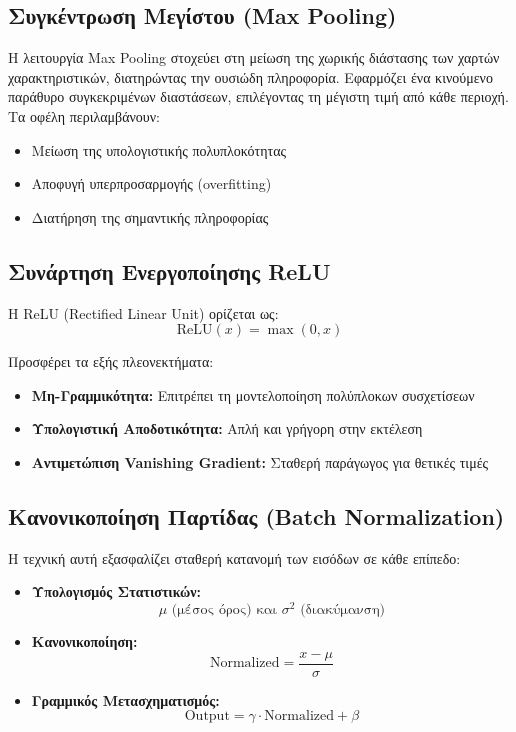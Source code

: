 \documentclass[a4paper,12pt]{article}
\begin{document}
\subsection*{Συγκέντρωση Μεγίστου (Max Pooling)}
Η λειτουργία Max Pooling στοχεύει στη μείωση της χωρικής διάστασης των χαρτών χαρακτηριστικών, διατηρώντας την ουσιώδη πληροφορία. Εφαρμόζει ένα κινούμενο παράθυρο συγκεκριμένων διαστάσεων, επιλέγοντας τη μέγιστη τιμή από κάθε περιοχή. Τα οφέλη περιλαμβάνουν:
\begin{itemize}
    \item Μείωση της υπολογιστικής πολυπλοκότητας
    \item Αποφυγή υπερπροσαρμογής (overfitting)
    \item Διατήρηση της σημαντικής πληροφορίας
\end{itemize}

\subsection*{Συνάρτηση Ενεργοποίησης ReLU}
Η ReLU (Rectified Linear Unit) ορίζεται ως:
\[ \text{ReLU}(x) = \max(0,x) \]

Προσφέρει τα εξής πλεονεκτήματα:
\begin{itemize}
    \item \textbf{Μη-Γραμμικότητα:} Επιτρέπει τη μοντελοποίηση πολύπλοκων συσχετίσεων
    \item \textbf{Υπολογιστική Αποδοτικότητα:} Απλή και γρήγορη στην εκτέλεση
    \item \textbf{Αντιμετώπιση Vanishing Gradient:} Σταθερή παράγωγος για θετικές τιμές
\end{itemize}

\subsection*{Κανονικοποίηση Παρτίδας (Batch Normalization)}
Η τεχνική αυτή εξασφαλίζει σταθερή κατανομή των εισόδων σε κάθε επίπεδο:

\begin{itemize}
    \item \textbf{Υπολογισμός Στατιστικών:}
          \[ \mu \text{ (μέσος όρος) και } \sigma^2 \text{ (διακύμανση)} \]

    \item \textbf{Κανονικοποίηση:}
          \[ \text{Normalized} = \frac{x - \mu}{\sigma} \]

    \item \textbf{Γραμμικός Μετασχηματισμός:}
          \[ \text{Output} = \gamma \cdot \text{Normalized} + \beta \]
\end{itemize}
\end{document}
